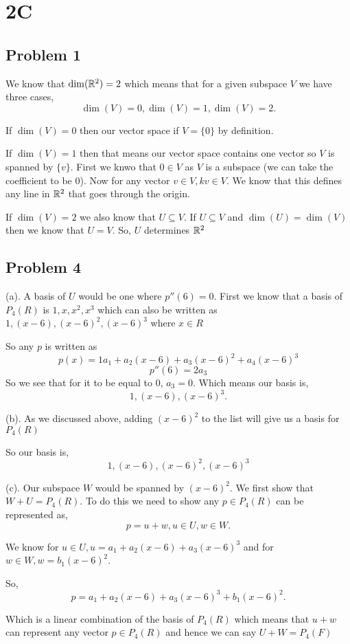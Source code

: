 \documentclass[a4paper]{report}
\begin{document}
\section*{2C}
\subsection*{Problem 1}
We know that $\dim(\mathbb{R}^2) = 2$ which means that for a given subspace $V$ we have three cases, \[
\dim(V) = 0,
\dim(V) = 1,
\dim(V) = 2
.\] 

If $\dim(V) = 0$ then our vector space if  $V = \{0\}$ by definition.

If  $\dim(V) = 1$ then that means our vector space contains one vector so $V$ is spanned by  $\{v\}$. First we knwo that $0 \in V $ as $V$ is a subspace (we can take the coefficient to be 0). Now for any vector $v \in V, kv \in V$. We know that this defines any line in $\mathbb{R}^2$ that goes through the origin.

If $\dim(V) = 2$ we also know that  $U \subseteq V$.  If $U \subseteq V$ and  $\dim(U) = \dim(V)$ then we know that  $ U = V$. So, $U$ determines  $\mathbb{R}^2$


\subsection*{Problem 4}
(a). A basis of $U$ would be one where $p''(6) = 0$. First we know that a basis of  $P_4(R)$ is  $1,x,x^2,x^3$ which can also be written as $1,(x-6),(x-6)^2,(x-6)^3$ where $x \in R$

So any $p$ is written as $$p(x) = 1a_1 + a_2(x-6) + a_3(x-6)^2 + a_4 (x - 6)^3$$
$$p''(6) = 2a_3$$
So we see that for it to be equal to 0, $a_3 = 0$. Which means our basis is, \[
1, (x - 6), (x-6)^3
.\] 

(b). As we discussed above, adding $(x-6)^2$ to the list will give us a basis for $P_4(R)$

So our basis is, $$1, (x-6),(x-6)^2, (x-6)^3$$


(c). Our subspace $W$ would be spanned by  $(x-6)^2$. We first show that $W + U = P_4(R)$. To do this we need to show any  $p \in P_4(R)$ can be represented as,  \[
p = u + w, u \in U, w \in W
.\] 

We know for $u \in U, u = a_1 + a_2(x-6) + a_3(x-6)^3$ and for $w \in W, w= b_1(x-6)^2$.

So, \[
p = a_1 + a_2(x-6) + a_3(x-6)^3 + b_1(x-6)^2
.\] 

Which is a linear combination of the basis of $P_4(R)$ which means that $u + w$ can represent any vector  $p \in P_4(R)$ and hence we can say $U + W = P_4(F)$
\end{document}
